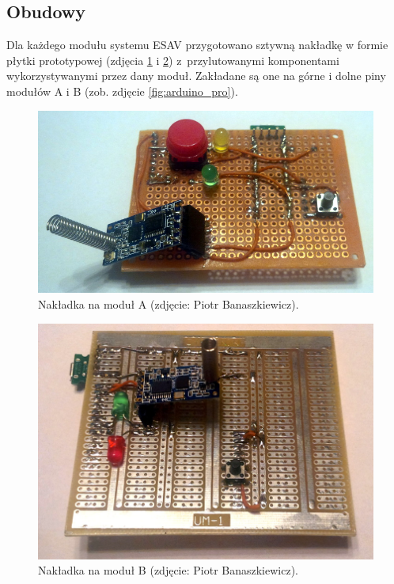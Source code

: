 \subsection{Obudowy}
\label{subsec:obudowy}

Dla każdego modułu systemu ESAV przygotowano sztywną nakładkę w formie płytki prototypowej (zdjęcia \ref{fig:moduleA_hat} i \ref{fig:moduleB_hat}) z~przylutowanymi komponentami wykorzystywanymi przez dany moduł. Zakładane są one na górne i dolne piny modułów A i B (zob. zdjęcie \ref{fig:arduino_pro}).

\begin{figure}[h]
	\centering
	\includegraphics[scale=0.3]{pics/moduleA_hat.jpg}
	\caption{\label{fig:moduleA_hat}Nakładka na moduł A (zdjęcie: Piotr Banaszkiewicz).}
\end{figure}

\begin{figure}[h]
	\centering
	\includegraphics[scale=0.25]{pics/moduleB_hat.jpg}
	\caption{\label{fig:moduleB_hat}Nakładka na moduł B (zdjęcie: Piotr Banaszkiewicz).}
\end{figure}

